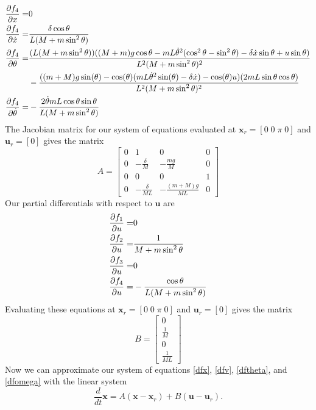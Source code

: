 \documentclass[]{article}
\newcommand{\bx}{\boldsymbol{x}}
\newcommand{\bu}{\boldsymbol{u}}
\begin{document}
\begin{eqnarray*}
	\pdv{f_4}{x} = & 0 \\
	\pdv{f_4}{\dot{x}} =&  \frac{\delta \cos \theta}{L(M + m \sin^2 \theta)} \\
	\pdv{f_4}{\theta} =  &  \frac{(L(M + m \sin^2 \theta))((M+m)g \cos \theta -mL\dot{\theta}^2(\cos^2 \theta - \sin^2 \theta) -\delta \dot{x} \sin \theta + u \sin \theta)}{L^2(M + m \sin^2 \theta)^2} \\
	& - \frac{((m+M)g\sin(\theta)-\cos(\theta)(mL{\dot{\theta}}^2\sin(\theta)-\delta \dot{x})-\cos(\theta)u)(2mL \sin \theta \cos \theta)}{L^2(M + m \sin^2 \theta)^2} \\
	\pdv{f_4}{\dot{\theta}} = & -\frac{2\dot{\theta}mL \cos \theta \sin \theta}{L(M + m \sin^2 \theta)}
\end{eqnarray*}
The Jacobian matrix for our system of equations evaluated at $\bx_r = [0\; 0\; \pi \; 0]$ and $\bu_r = [0]$ gives the matrix
\begin{equation}
		A = 
	\begin{bmatrix}
		0 & 1              & 0                          & 0 \\
		0 & -\frac{\delta}{M}      & -\frac{mg}{M}                 & 0 \\
		0 & 0              & 0                          & 1 \\
		0 & -\frac{\delta}{ML} & -\frac{(m+M)g}{ML} & 0
	\end{bmatrix} \label{A}
\end{equation}
Our partial differentials with respect to $\bu$ are
\begin{eqnarray*}
	\pdv{f_1}{u} = & 0 \\
	\pdv{f_2}{u} = & \frac{1}{M + m \sin^2 \theta}\\
	\pdv{f_3}{u} =  & 0 \\
	\pdv{f_4}{u} = & -\frac{\cos \theta}{L(M + m \sin^2 \theta)}
\end{eqnarray*}
Evaluating these equations at $\bx_r = [0\; 0\; \pi \; 0]$ and $\bu_r = [0]$ gives the matrix
\begin{equation}
	B = 
	\begin{bmatrix}
		0 \\
		\frac{1}{M}  \\
		0  \\
		\frac{1}{ML}   
	\end{bmatrix}
\end{equation}
Now we can approximate our system of equations \eqref{dfx}, \eqref{dfv}, \eqref{dftheta}, and \eqref{dfomega} with the linear system
\begin{equation}
	\frac{d}{dt} \bx = A(\bx - \bx_r) + B (\bu - \bu_r). \label{lin_mod}
\end{equation}
\end{document}
